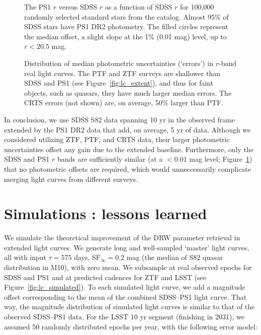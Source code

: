 \documentclass[twocolumn]{aastex62}
\begin{document}
\begin{figure}
	\caption{The PS1 $r$ versus SDSS $r$ as a function of SDSS $r$ for 100,000 randomly selected standard stars from the \citet{ivezic2007} catalog. Almost 95\% of SDSS stars have PS1 DR2 photometry. The filled circles represent the median offset, a slight slope at the 1\% (0.01 mag) level, up to $r<20.5$ mag.}
	\label{fig:offsetPS1mag}
\end{figure} 


\begin{figure}
	\caption{Distribution of median photometric uncertainties (`errors') in $r$-band real light curves. The PTF and ZTF surveys are shallower than SDSS and PS1 (see Figure~\ref{fig:lc_extent}), and thus for faint objects, such as quasars, they have much larger median errors. The CRTS errors (not shown) are, on average, 50\% larger than PTF.}
	\label{fig:lc_errors}
\end{figure} 


In conclusion, we use SDSS S82 data spanning 10 yr in the observed frame extended by the PS1 DR2 data that add, on average, 5 yr of data. Although we considered utilizing ZTF, PTF, and CRTS data, their larger photometric uncertainties offset any gain due to the extended baseline. Furthermore, only the SDSS and PS1 $r$ bands are sufficiently similar (at a ${<} 0.01$ mag level; Figure~\ref{fig:offsetPS1mag}) that no photometric offsets are required, which would unneccessarily complicate merging light curves from different surveys.
%
%
%
%
%

\section{Simulations : lessons learned}\label{sec:simulation}

We simulate the theoretical improvement of the DRW parameter retrieval in extended light curves. We generate long and well-sampled  `master' light curves, all with input $\tau = 575 $ days, SF$_{\infty} = 0.2$ mag (the median of S82 quasar distribution in M10), with zero mean.  We subsample at real observed epochs for SDSS and PS1 and at predicted cadences for ZTF and LSST  (see Figure~\ref{fig:lc_simulated}). To each simulated light curve, we add a magnitude offset corresponding to the mean of the combined SDSS--PS1 light curve. That way, the magnitude distribution of simulated light curves is similar to that of the observed SDSS--PS1 data. For the LSST 10 yr segment (finishing in 2031), we assumed 50 randomly distributed  epochs per year, with the following error model:
\end{document}
